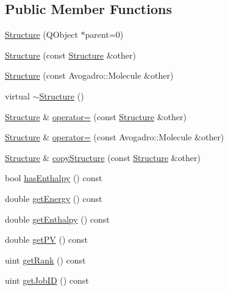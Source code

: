 \subsection*{Public Member Functions}
\begin{DoxyCompactItemize}
\item 
\hyperlink{classGlobalSearch_1_1Structure_ab7e8a0041535442bca879148833831ac}{Structure} (Q\+Object $\ast$parent=0)
\item 
\hyperlink{classGlobalSearch_1_1Structure_ad5f2adb0f379ee6dde14984df3eb73bc}{Structure} (const \hyperlink{classGlobalSearch_1_1Structure}{Structure} \&other)
\item 
\hyperlink{classGlobalSearch_1_1Structure_a2630d5c42da1cd86bd0c3b7d79e69618}{Structure} (const Avogadro\+::\+Molecule \&other)
\item 
virtual \hyperlink{classGlobalSearch_1_1Structure_a29cc3acd03872d7641a2fd76a53e0491}{$\sim$\+Structure} ()
\item 
\hyperlink{classGlobalSearch_1_1Structure}{Structure} \& \hyperlink{classGlobalSearch_1_1Structure_a4b257e8547d62da1c2393c123da994f1}{operator=} (const \hyperlink{classGlobalSearch_1_1Structure}{Structure} \&other)
\item 
\hyperlink{classGlobalSearch_1_1Structure}{Structure} \& \hyperlink{classGlobalSearch_1_1Structure_a22737e6da3810566ad0b8c6b672e1214}{operator=} (const Avogadro\+::\+Molecule \&other)
\item 
\hyperlink{classGlobalSearch_1_1Structure}{Structure} \& \hyperlink{classGlobalSearch_1_1Structure_accb684b9686676fd61164f298460f195}{copy\+Structure} (const \hyperlink{classGlobalSearch_1_1Structure}{Structure} \&other)
\item 
bool \hyperlink{classGlobalSearch_1_1Structure_a6f963ec03dda49caa05f5eb8a9f19c39}{has\+Enthalpy} () const 
\item 
double \hyperlink{classGlobalSearch_1_1Structure_acc6db7487d8bbeacda3868734f4294bd}{get\+Energy} () const 
\item 
double \hyperlink{classGlobalSearch_1_1Structure_a45e5069495574ae2d4b73a1759b7326b}{get\+Enthalpy} () const 
\item 
double \hyperlink{classGlobalSearch_1_1Structure_a66f08d0683f89fa6791b5b7b9838955d}{get\+P\+V} () const 
\item 
uint \hyperlink{classGlobalSearch_1_1Structure_aad467ff9bf423156b7cc8df3a2fb7b13}{get\+Rank} () const 
\item 
uint \hyperlink{classGlobalSearch_1_1Structure_a6d044ecacb068406234a502d30664bea}{get\+Job\+I\+D} () const 

\end{DoxyCompactItemize}
